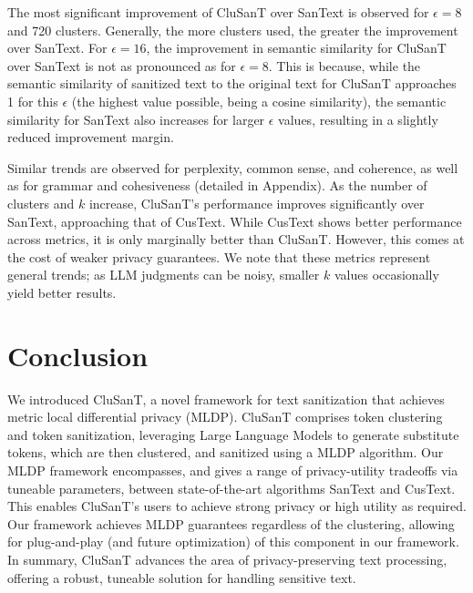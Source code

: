 \documentclass[11pt]{article}
\newcommand{\clusant}{CluSanT\xspace}
\begin{document}
The most significant improvement of \clusant over SanText is observed for $\epsilon = 8$ and 720 clusters. Generally, the more clusters used, the greater the improvement over SanText. For $\epsilon = 16$, the improvement in semantic similarity for \clusant over SanText is not as pronounced as for $\epsilon = 8$. This is because, while the semantic similarity of sanitized text to the original text for \clusant approaches 1 for this $\epsilon$ (the highest value possible, being a cosine similarity), the semantic similarity for SanText also increases for larger $\epsilon$ values, resulting in a slightly reduced improvement margin.

Similar trends are observed for perplexity, common sense, and coherence, as well as for grammar and cohesiveness (detailed in Appendix). As the number of clusters and $k$ increase, \clusant's performance improves significantly over SanText, approaching that of CusText. While CusText shows better performance across metrics, it is only marginally better than \clusant. However, this comes at the cost of weaker privacy guarantees.
We note that these metrics represent general trends; as LLM judgments can be noisy, smaller $k$ values occasionally yield better results.




\section{Conclusion}
We introduced \clusant, a novel framework for text sanitization that achieves metric local differential privacy (MLDP). %
\clusant comprises token clustering and token sanitization, leveraging Large Language Models to generate substitute tokens, which are then clustered, and sanitized using a MLDP algorithm.
Our MLDP framework encompasses, and gives a range of privacy-utility tradeoffs via tuneable parameters,  between state-of-the-art algorithms  SanText and CusText. %
This enables \clusant's users to achieve strong privacy or high utility as required. 
Our framework achieves MLDP guarantees regardless of the clustering, allowing for plug-and-play (and future optimization) of %
this component in our framework. 
In summary, \clusant advances the area of privacy-preserving text processing, 
offering a robust, tuneable solution for handling sensitive text. %
\end{document}
